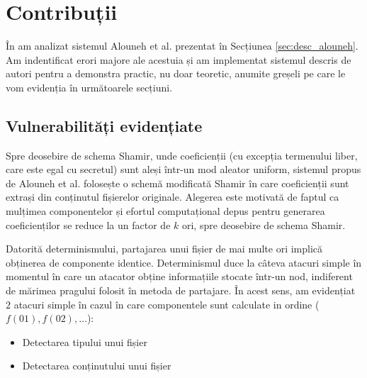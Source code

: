 \documentclass[oneside, 12pt]{book}
\begin{document}

\section{Contribuții}
\label{sec:alouneh_contributions}

În \cite{RD:2015} am analizat sistemul Alouneh et al. prezentat în Secțiunea \ref{sec:desc_alouneh}. Am indentificat erori majore ale acestuia și am implementat sistemul descris de autori pentru a demonstra practic, nu doar teoretic, anumite greșeli pe care le vom evidenția în următoarele secțiuni.

\subsection{Vulnerabilități evidențiate}

Spre deosebire de schema Shamir, unde coeficienții (cu excepția termenului liber, care este egal cu secretul) sunt aleși într-un mod aleator uniform, sistemul propus de Alouneh et al. folosește o schemă modificată Shamir în care coeficienții sunt extrași din conținutul fișierelor originale.
Alegerea este motivată de faptul ca mulțimea componentelor și efortul computațional depus pentru generarea coeficienților se reduce la un factor de $k$ ori, spre deosebire de schema Shamir.

Datorită determinismului, partajarea unui fișier de mai multe ori implică obținerea de componente identice.
Determinismul duce la câteva atacuri simple în momentul în care un atacator obține informațiile stocate într-un nod, indiferent de mărimea pragului folosit în metoda de partajare. În acest sens, am evidențiat $2$ atacuri simple în cazul în care componentele sunt calculate in ordine ($f(01), f(02), \dots$):
\begin{itemize}
	\item Detectarea tipului unui fișier
	\item Detectarea conținutului unui fișier
\end{itemize}
\end{document}
